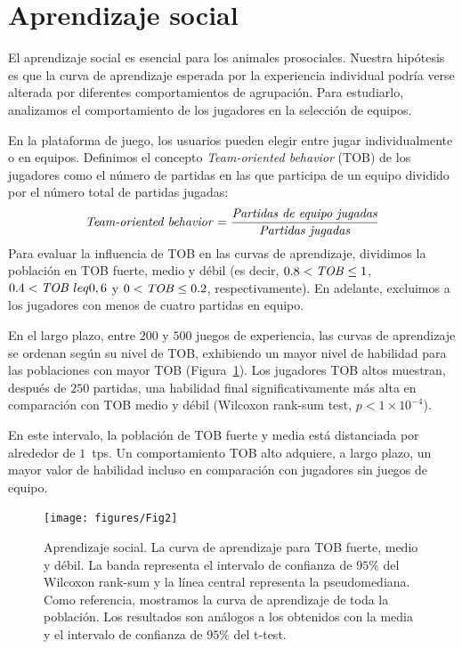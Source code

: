 \documentclass[a4paper,11pt]{book}
\theoremstyle{definition}
\begin{document}
\section{Aprendizaje social}

El aprendizaje social es esencial para los animales prosociales.
%
Nuestra hip\'otesis es que la curva de aprendizaje esperada por la experiencia individual podr\'ia verse alterada por diferentes comportamientos de agrupaci\'on.
%
Para estudiarlo, analizamos el comportamiento de los jugadores en la selecci\'on de equipos.


En la plataforma de juego, los usuarios pueden elegir entre jugar individualmente o en equipos.
%
Definimos el concepto \emph{Team-oriented behavior} (TOB) de los jugadores como el n\'umero de partidas en las que participa de un equipo dividido por el n\'umero total de partidas jugadas:
%
\begin{equation}
\text{\emph{Team-oriented behavior}} = \frac{\text{\emph{Partidas de equipo jugadas}}}{\text{\emph{Partidas jugadas}}}
\end{equation}
%
Para evaluar la influencia de TOB en las curvas de aprendizaje, dividimos la poblaci\'on en TOB fuerte, medio y d\'ebil (es decir, $0.8<\text{\emph{TOB}}\leq 1$, $0.4 <\text{\emph{TOB}}\ leq 0,6$ y $0 <\text{\emph{TOB}}\leq 0.2$, respectivamente).
%
En adelante, excluimos a los jugadores con menos de cuatro partidas en equipo.


En el largo plazo, entre $200$ y $500$ juegos de experiencia, las curvas de aprendizaje se ordenan seg\'un su nivel de TOB, exhibiendo un mayor nivel de habilidad para las poblaciones con mayor TOB (Figura~\ref{learningskill_team_hasta4team}).
%
Los jugadores TOB altos muestran, despu\'es de $250$ partidas, una habilidad final significativamente m\'as alta en comparaci\'on con TOB medio y d\'ebil (Wilcoxon rank-sum test, $p<1 \times10^{-4}$).


En este intervalo, la poblaci\'on de TOB fuerte y media est\'a distanciada por alrededor de $1$~tps.
%
Un comportamiento TOB alto adquiere, a largo plazo, un mayor valor de habilidad incluso en comparaci\'on con jugadores sin juegos de equipo.


\begin{figure}[ht!]
\centering
\texttt{[image: figures/Fig2]}
\caption{
Aprendizaje social.
%
La curva de aprendizaje para TOB fuerte, medio y d\'ebil.
%
La banda representa el intervalo de confianza de $95\%$ del Wilcoxon rank-sum y la l\'inea central representa la pseudomediana.
%
Como referencia, mostramos la curva de aprendizaje de toda la poblaci\'on.
%
Los resultados son an\'alogos a los obtenidos con la media y el intervalo de confianza de $95\%$ del t-test.
}
\label{learningskill_team_hasta4team}
\end{figure}
\end{document}
